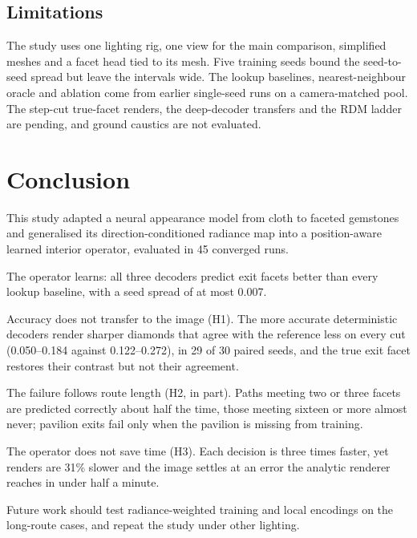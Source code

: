 \documentclass[conference]{IEEEtran}
\begin{document}
\subsection{Limitations}
The study uses one lighting rig, one view for the main comparison, simplified
meshes and a facet head tied to its mesh. Five training seeds bound the
seed-to-seed spread but leave the intervals wide. The lookup baselines,
nearest-neighbour oracle and ablation come from earlier single-seed runs on a
camera-matched pool. The step-cut true-facet renders, the deep-decoder transfers
and the RDM ladder are pending, and ground caustics are not evaluated.

\section{Conclusion}
This study adapted a neural appearance model from cloth to faceted gemstones
and generalised its direction-conditioned radiance map into a position-aware
learned interior operator, evaluated in 45 converged runs.

The operator learns: all three decoders predict exit facets better than every
lookup baseline, with a seed spread of at most 0.007.

Accuracy does not transfer to the image (H1). The more accurate deterministic
decoders render sharper diamonds that agree with the reference less on every cut
(0.050--0.184 against 0.122--0.272), in 29 of 30 paired seeds, and the true exit
facet restores their contrast but not their agreement.

The failure follows route length (H2, in part). Paths meeting two or three
facets are predicted correctly about half the time, those meeting sixteen or
more almost never; pavilion exits fail only when the pavilion is missing from
training.

The operator does not save time (H3). Each decision is three times faster, yet
renders are 31\% slower and the image settles at an error the analytic renderer
reaches in under half a minute.

Future work should test radiance-weighted training and local encodings on the
long-route cases, and repeat the study under other lighting.
\end{document}
